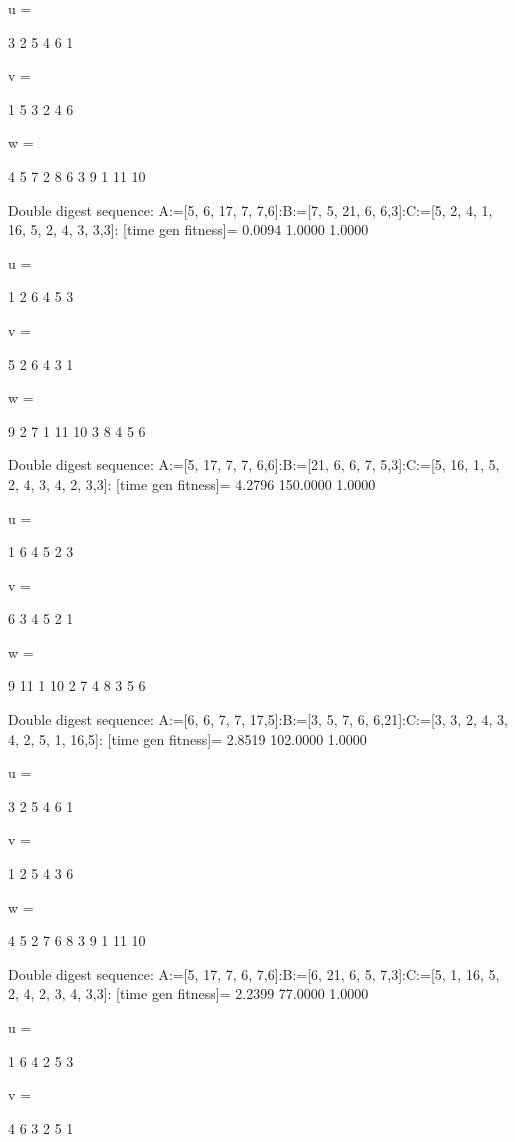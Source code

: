 u =

     3     2     5     4     6     1


v =

     1     5     3     2     4     6


w =

     4     5     7     2     8     6     3     9     1    11    10

Double digest sequence:
A:=[5, 6, 17, 7, 7,6]:B:=[7, 5, 21, 6, 6,3]:C:=[5, 2, 4, 1, 16, 5, 2, 4, 3, 3,3]:
[time gen fitness]=
    0.0094    1.0000    1.0000


u =

     1     2     6     4     5     3


v =

     5     2     6     4     3     1


w =

     9     2     7     1    11    10     3     8     4     5     6

Double digest sequence:
A:=[5, 17, 7, 7, 6,6]:B:=[21, 6, 6, 7, 5,3]:C:=[5, 16, 1, 5, 2, 4, 3, 4, 2, 3,3]:
[time gen fitness]=
    4.2796  150.0000    1.0000


u =

     1     6     4     5     2     3


v =

     6     3     4     5     2     1


w =

     9    11     1    10     2     7     4     8     3     5     6

Double digest sequence:
A:=[6, 6, 7, 7, 17,5]:B:=[3, 5, 7, 6, 6,21]:C:=[3, 3, 2, 4, 3, 4, 2, 5, 1, 16,5]:
[time gen fitness]=
    2.8519  102.0000    1.0000


u =

     3     2     5     4     6     1


v =

     1     2     5     4     3     6


w =

     4     5     2     7     6     8     3     9     1    11    10

Double digest sequence:
A:=[5, 17, 7, 6, 7,6]:B:=[6, 21, 6, 5, 7,3]:C:=[5, 1, 16, 5, 2, 4, 2, 3, 4, 3,3]:
[time gen fitness]=
    2.2399   77.0000    1.0000


u =

     1     6     4     2     5     3


v =

     4     6     3     2     5     1



